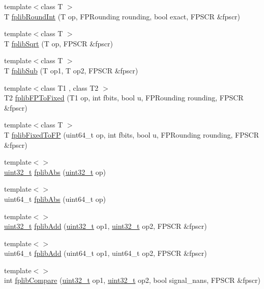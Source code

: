 \begin{DoxyCompactItemize}
\item 
{\footnotesize template$<$class T $>$ }\\T \hyperlink{namespaceArmISA_acbff4129231b5fde47b44645b9aa9cc7}{fplibRoundInt} (T op, FPRounding rounding, bool exact, FPSCR \&fpscr)
\item 
{\footnotesize template$<$class T $>$ }\\T \hyperlink{namespaceArmISA_a8646271a6c71610d417bf3e00f5dfdad}{fplibSqrt} (T op, FPSCR \&fpscr)
\item 
{\footnotesize template$<$class T $>$ }\\T \hyperlink{namespaceArmISA_aae2fc2a943d32c1fa631731b827322e1}{fplibSub} (T op1, T op2, FPSCR \&fpscr)
\item 
{\footnotesize template$<$class T1 , class T2 $>$ }\\T2 \hyperlink{namespaceArmISA_aee22b90d54d8f518c006d4f23057465d}{fplibFPToFixed} (T1 op, int fbits, bool u, FPRounding rounding, FPSCR \&fpscr)
\item 
{\footnotesize template$<$class T $>$ }\\T \hyperlink{namespaceArmISA_a4003e2ce5ab8d3923852099c02f0b0aa}{fplibFixedToFP} (uint64\_\-t op, int fbits, bool u, FPRounding rounding, FPSCR \&fpscr)
\item 
{\footnotesize template$<$$>$ }\\\hyperlink{Type_8hh_a435d1572bf3f880d55459d9805097f62}{uint32\_\-t} \hyperlink{namespaceArmISA_a88f7062127be5875d97894bec7466af9}{fplibAbs} (\hyperlink{Type_8hh_a435d1572bf3f880d55459d9805097f62}{uint32\_\-t} op)
\item 
{\footnotesize template$<$$>$ }\\uint64\_\-t \hyperlink{namespaceArmISA_a04937664ed06f6928dd084ea9dda23f5}{fplibAbs} (uint64\_\-t op)
\item 
{\footnotesize template$<$$>$ }\\\hyperlink{Type_8hh_a435d1572bf3f880d55459d9805097f62}{uint32\_\-t} \hyperlink{namespaceArmISA_a953ee43de9711746b8bf39b152e07c3c}{fplibAdd} (\hyperlink{Type_8hh_a435d1572bf3f880d55459d9805097f62}{uint32\_\-t} op1, \hyperlink{Type_8hh_a435d1572bf3f880d55459d9805097f62}{uint32\_\-t} op2, FPSCR \&fpscr)
\item 
{\footnotesize template$<$$>$ }\\uint64\_\-t \hyperlink{namespaceArmISA_a23e05961468137d56912572aaeb94899}{fplibAdd} (uint64\_\-t op1, uint64\_\-t op2, FPSCR \&fpscr)
\item 
{\footnotesize template$<$$>$ }\\int \hyperlink{namespaceArmISA_adae25f4c649c825b6ab862cafa8392d2}{fplibCompare} (\hyperlink{Type_8hh_a435d1572bf3f880d55459d9805097f62}{uint32\_\-t} op1, \hyperlink{Type_8hh_a435d1572bf3f880d55459d9805097f62}{uint32\_\-t} op2, bool signal\_\-nans, FPSCR \&fpscr)

\end{DoxyCompactItemize}
